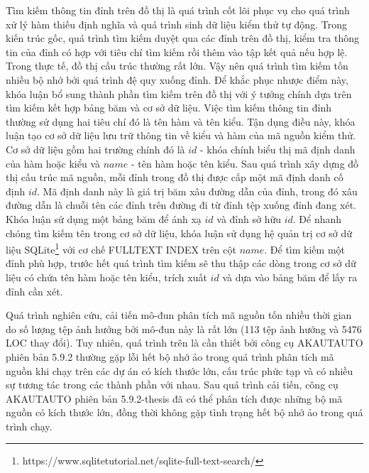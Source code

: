 Tìm kiếm thông tin đỉnh trên đồ thị là quá trình cốt lõi phục vụ cho quá trình xử lý hàm thiếu định nghĩa và quá trình sinh dữ liệu kiểm thử tự động. Trong kiến trúc gốc, quá trình tìm kiếm duyệt qua các đỉnh trên đồ thị, kiểm tra thông tin của đỉnh có hợp với tiêu chí tìm kiếm rồi thêm vào tập kết quả nếu hợp lệ. Trong thực tế, đồ thị cấu trúc thường rất lớn. Vậy nên quá trình tìm kiếm tốn nhiều bộ nhớ bởi quá trình đệ quy xuống đỉnh. Để khắc phục nhược điểm này, khóa luận bổ sung thành phần tìm kiếm trên đồ thị với ý tưởng chính dựa trên tìm kiếm kết hợp bảng băm và cơ sở dữ liệu. Việc tìm kiếm thông tin đỉnh thường sử dụng hai tiêu chí đó là tên hàm và tên kiểu. Tận dụng điều này, khóa luận tạo cơ sở dữ liệu lưu trữ thông tin về kiểu và hàm của mã nguồn kiểm thử. Cơ sở dữ liệu gồm hai trường chính đó là $id$ - khóa chính biểu thị mã định danh của hàm hoặc kiểu và $name$ - tên hàm hoặc tên kiểu. Sau quá trình xây dựng đồ thị cấu trúc mã nguồn, mỗi đỉnh trong đồ thị được cấp một mã định danh cố định $id$. Mã định danh này là giá trị băm xâu đường dẫn của đỉnh, trong đó xâu đường dẫn là chuỗi tên các đỉnh trên đường đi từ đỉnh tệp xuống đỉnh đang xét. Khóa luận sử dụng một bảng băm để ánh xạ $id$ và đỉnh sở hữu $id$. Để nhanh chóng tìm kiếm tên trong cơ sở dữ liệu, khóa luận sử dụng hệ quản trị cơ sở dữ liệu SQLite\footnote{https://www.sqlitetutorial.net/sqlite-full-text-search/} với cơ chế FULLTEXT INDEX trên cột $name$. Để tìm kiếm một đỉnh phù hợp, trước hết quá trình tìm kiếm sẽ thu thập các dòng trong cơ sở dữ liệu có chứa tên hàm hoặc tên kiểu, trích xuất $id$ và dựa vào bảng băm để lấy ra đỉnh cần xét. 

Quá trình nghiên cứu, cải tiến mô-đun phân tích mã nguồn tốn nhiều thời gian do số lượng tệp ảnh hưởng bởi mô-đun này là rất lớn (113 tệp ảnh hưởng và 5476 LOC thay đổi). Tuy nhiên, quá trình trên là cần thiết bởi công cụ AKAUTAUTO phiên bản 5.9.2 thường gặp lỗi hết bộ nhớ ảo trong quá trình phân tích mã nguồn khi chạy trên các dự án có kích thước lớn, cấu trúc phức tạp và có nhiều sự tương tác trong các thành phần với nhau. Sau quá trình cải tiến, công cụ AKAUTAUTO phiên bản 5.9.2-thesis đã có thể phân tích được những bộ mã nguồn có kích thước lớn, đồng thời không gặp tình trạng hết bộ nhớ ảo trong quá trình chạy.

